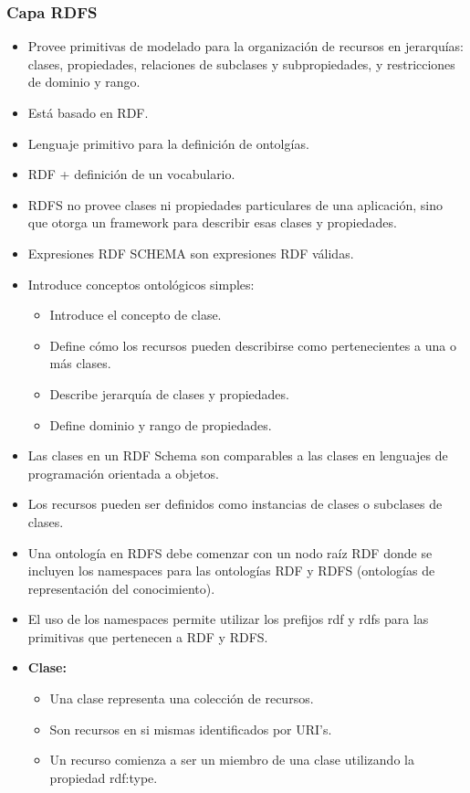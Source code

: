 \documentclass[a4paper,12pt,twoside,final,spanish]{article}
\begin{document}
\subsubsection{Capa RDFS}

\begin{itemize}
\item Provee primitivas de modelado para la organización de recursos en jerarquías: clases, propiedades, relaciones de subclases y subpropiedades, y restricciones de dominio y rango.
\item Está basado en RDF.
\item Lenguaje primitivo para la definición de ontolgías.
\item RDF + definición de un vocabulario.
\item RDFS no provee clases ni propiedades particulares de una aplicación, sino que otorga un framework para describir esas clases y propiedades.
\item Expresiones RDF SCHEMA son expresiones RDF válidas.
\item Introduce conceptos ontológicos simples:
	\begin{itemize}
	\item Introduce el concepto de clase.
	\item Define cómo los recursos pueden describirse como pertenecientes a una o más 		clases.
	\item Describe jerarquía de clases y propiedades.
	\item Define dominio y rango de propiedades.
	\end{itemize}
\item Las clases en un RDF Schema son comparables a las clases en lenguajes de  programación orientada a objetos.
\item Los recursos pueden ser definidos como instancias de clases o subclases de clases.
\item Una ontología en RDFS debe comenzar con un nodo raíz RDF donde se incluyen los namespaces para las ontologías RDF y RDFS (ontologías de representación del conocimiento).
\item El uso de los namespaces permite utilizar los prefijos rdf y rdfs para las primitivas que pertenecen a RDF y RDFS.
\item \textbf{Clase:}
	\begin{itemize}
	\item Una clase representa una colección de recursos.
	\item Son recursos en si mismas identificados por URI's.
	\item Un recurso comienza a ser un miembro de una clase utilizando la propiedad 		rdf:type.

\end{itemize}
\end{itemize}
\end{document}
